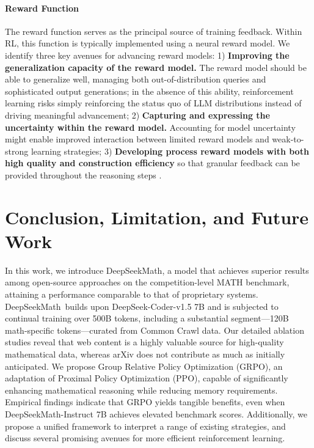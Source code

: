 \begin{itemize}[topsep=0pt]
\begin{itemize}[topsep=0pt]
\paragraph{Reward Function} The reward function serves as the principal source of training feedback. Within RL, this function is typically implemented using a neural reward model. We identify three key avenues for advancing reward models: 1) \textbf{Improving the generalization capacity of the reward model.} The reward model should be able to generalize well, managing both out-of-distribution queries and sophisticated output generations; in the absence of this ability, reinforcement learning risks simply reinforcing the status quo of LLM distributions instead of driving meaningful advancement; 2) \textbf{Capturing and expressing the uncertainty within the reward model.} Accounting for model uncertainty might enable improved interaction between limited reward models and weak-to-strong learning strategies; 3) \textbf{Developing process reward models with both high quality and construction efficiency} so that granular feedback can be provided throughout the reasoning steps \citep{lightman2023let,wang2023math}.

\section{Conclusion, Limitation, and Future Work} 
In this work, we introduce DeepSeekMath, a model that achieves superior results among open-source approaches on the competition-level MATH benchmark, attaining a performance comparable to that of proprietary systems. DeepSeekMath~builds upon DeepSeek-Coder-v1.5 7B and is subjected to continual training over 500B tokens, including a substantial segment—120B math-specific tokens—curated from Common Crawl data. Our detailed ablation studies reveal that web content is a highly valuable source for high-quality mathematical data, whereas arXiv does not contribute as much as initially anticipated. We propose Group Relative Policy Optimization (GRPO), an adaptation of Proximal Policy Optimization (PPO), capable of significantly enhancing mathematical reasoning while reducing memory requirements. Empirical findings indicate that GRPO yields tangible benefits, even when DeepSeekMath-Instruct 7B achieves elevated benchmark scores. Additionally, we propose a unified framework to interpret a range of existing strategies, and discuss several promising avenues for more efficient reinforcement learning.


\end{itemize}
\end{itemize}

